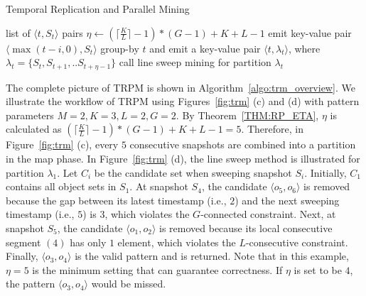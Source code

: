 \begin{algorithm}[h]
\caption{Temporal Replication and Parallel Mining}
\label{algo:trm_overview}
\begin{algorithmic}[1]
\Require list of $\langle t, S_t \rangle$ pairs
\State $\eta \gets (\lceil \frac{K}{L} \rceil -1)*(G-1)+K+L-1$
\label{code:trm-map-start}
		\State emit key-value pair $\langle \max(t-i,0), S_t \rangle$ 
	\EndFor  
\EndFor
\label{code:trm-map-end}
\label{code:trm-par-start}
\State group-by $t$ and emit a key-value pair $\langle t, \lambda_t\rangle$, where $\lambda_t = \{S_t, S_{t+1}, .. S_{t+\eta-1}\} $
\EndFor
\label{code:trm-par-end}
\label{code:trm-red-start}
\State call line sweep mining for partition $\lambda_t$
\label{code:trm-red-end}
\EndFor
\end{algorithmic}
\end{algorithm}

The complete picture of TRPM is shown in Algorithm~\ref{algo:trm_overview}. We illustrate the  workflow of TRPM using Figures~\ref{fig:trm} (c) and (d) with pattern
parameters $M=2, K=3, L = 2, G=2$. By Theorem~\ref{THM:RP_ETA}, $\eta$ is calculated
as $(\lceil \frac{K}{L} \rceil-1) *(G-1)+ K + L - 1 = 5$. Therefore, 
in Figure~\ref{fig:trm} (c), every $5$ consecutive snapshots are combined 
into a partition in the map phase. In Figure~\ref{fig:trm} (d), the line sweep
method is illustrated for partition $\lambda_1$. Let $C_i$ be the candidate set when sweeping snapshot $S_i$.
Initially, $C_1$ contains 
all object sets in 
$S_1$.
At snapshot 
$S_4$, the candidate
$\langle o_5,o_6 \rangle$ is removed because the gap between its latest timestamp (i.e., $2$)
and the next sweeping timestamp (i.e., $5$) is $3$, which violates the $G$-connected constraint.
Next, at snapshot 
$S_5$, the candidate $\langle o_1,o_2 \rangle$ is removed
because its local consecutive segment $(4)$ has only $1$ element,
which violates the $L$-consecutive constraint.
Finally, $\langle o_3,o_4 \rangle$ is the valid pattern and is returned. 
Note that in this example, $\eta=5$ is the minimum setting that 
can guarantee correctness. If $\eta$ is set to be $4$, the pattern $\langle o_3,o_4 \rangle$ would be missed. 




